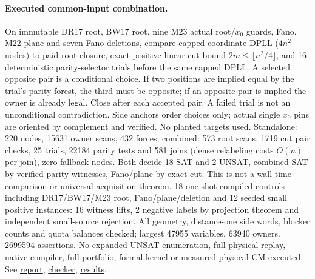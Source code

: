 \documentclass[11pt]{article}
\begin{document}
\paragraph{Executed common-input combination.}
On immutable DR17 root, BW17 root, nine M23 actual root/$x_0$ guards, Fano, M22 plane and seven Fano deletions, compare capped coordinate DPLL ($4n^2$ nodes) to paid root closure, exact positive linear cut bound $2m\le\lfloor n^2/4\rfloor$, and 16 deterministic parity-selector trials before the same capped DPLL. A selected opposite pair is a conditional choice. If two positions are implied equal by the trial's parity forest, the third must be opposite; if an opposite pair is implied the owner is already legal. Close after each accepted pair. A failed trial is not an unconditional contradiction. Side anchors order choices only; actual single $x_0$ pins are oriented by complement and verified. No planted targets used. Standalone: 220 nodes, 15631 owner scans, 432 forces; combined: 573 root scans, 1719 cut pair checks, 25 trials, 22184 parity tests and 581 joins (dense relabeling costs $O(n)$ per join), zero fallback nodes. Both decide 18 SAT and 2 UNSAT, combined SAT by verified parity witnesses, Fano/plane by exact cut. This is not a wall-time comparison or universal acquisition theorem. 18 one-shot compiled controls including DR17/BW17/M23 root, Fano/plane/deletion and 12 seeded small positive instances: 16 witness lifts, 2 negative labels by projection theorem and independent small-source rejection. All geometry, distance-one side words, blocker counts and quota balances checked; largest 47955 variables, 63940 owners. 2699594 assertions. No expanded UNSAT enumeration, full physical replay, native compiler, full portfolio, formal kernel or measured physical CM executed. See \href{https://github.com/j15marti/pnp/commit/a38bcdcb50a1b7e75673548ec4995ae46fc77da4}{report}, \href{https://github.com/j15marti/pnp/commit/7d0f1ec593cc4bac6bcf1db466ce9d80bfd92886}{checker}, \href{https://github.com/j15marti/pnp/commit/245de72c58b77c50a62f8183b6c7bad9999cd9cf}{results}.
\end{document}
